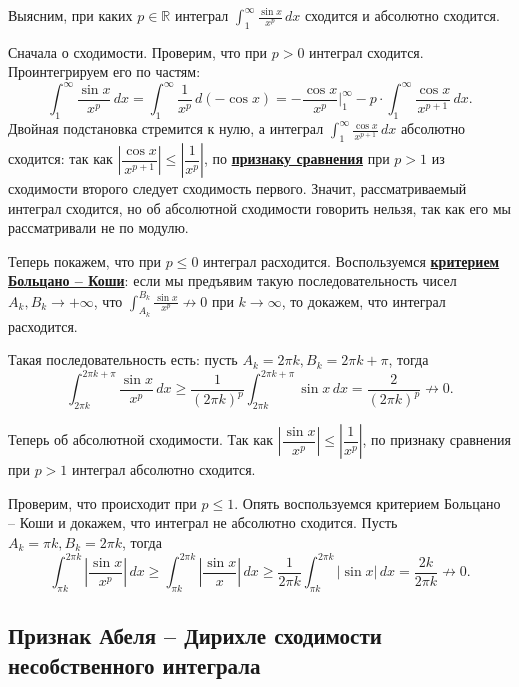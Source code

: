\begin{example}
	Выясним, при каких \(p \in \mathbb{R}\) интеграл \(\displaystyle \int_1^{\infty} \frac{\sin x}{x^p} \, dx\) сходится и абсолютно сходится.
	
	Сначала о сходимости. Проверим, что при \(p > 0\) интеграл сходится. Проинтегрируем его по частям: \[
		\int_1^{\infty} \frac{\sin x}{x^p} \, dx = \int_{1}^{\infty} \frac{1}{x^p} \, d(-\cos x) = -\frac{\cos x}{x^p} \bigg|_1^\infty - p \cdot \int_{1}^{\infty} \frac{\cos x}{x^{p+1}} \, dx.
	\]
	Двойная подстановка стремится к нулю, а интеграл \(\displaystyle \int_{1}^{\infty} \frac{\cos x}{x^{p+1}} \, dx\) абсолютно сходится: так как \(\left|\dfrac{\cos x}{x^{p+1}} \right| \leqslant \left|\dfrac{1}{x^p} \right|\), по \hyperlink{priz}{\bfseries признаку сравнения} при \(p > 1\) из сходимости второго следует сходимость первого. Значит, рассматриваемый интеграл сходится, но об абсолютной сходимости говорить нельзя, так как его мы рассматривали не по модулю.
	
	Теперь покажем, что при \(p \leqslant 0\) интеграл расходится. Воспользуемся \hyperlink{Критерий Больцано -- Коши сходимости несобственного интеграла}{\bfseries критерием Больцано -- Коши}: если мы предъявим такую последовательность чисел \(A_k, B_k \to +\infty\), что \(\displaystyle \int_{A_k}^{B_k} \frac{\sin x}{x^p} \not\to 0\) при \(k \to \infty\), то докажем, что интеграл расходится.
	
	Такая последовательность есть: пусть \(A_k = 2\pi k, B_k = 2\pi k + \pi\), тогда \[
		\int_{2\pi k}^{2\pi k + \pi} \frac{\sin x}{x^p} \, dx \geqslant \frac{1}{(2\pi k)^p} \int_{2\pi k}^{2\pi k + \pi} \sin x \, dx = \frac{2}{(2\pi k)^p} \not\to 0.
	\]
	
	Теперь об абсолютной сходимости. Так как \(\left|\dfrac{\sin x}{x^p}\right| \leqslant \left|\dfrac{1}{x^p}\right|\), по признаку сравнения при \(p > 1\) интеграл абсолютно сходится.
	
	Проверим, что происходит при \(p \leqslant 1\). Опять воспользуемся критерием Больцано -- Коши и докажем, что интеграл не абсолютно сходится. Пусть \(A_k = \pi k, B_k = 2 \pi k\), тогда \[
		\int_{\pi k}^{2\pi k} \left|\frac{\sin x}{x^p} \right| \, dx \geqslant \int_{\pi k}^{2\pi k} \left|\frac{\sin x}{x} \right| \, dx \geqslant \frac{1}{2\pi k} \int_{\pi k}^{2\pi k} \left|\sin x \right| \, dx = \frac{2k}{2\pi k} \not\to 0.
	\]
\end{example}

\subsection{Признак Абеля -- Дирихле сходимости несобственного интеграла}

